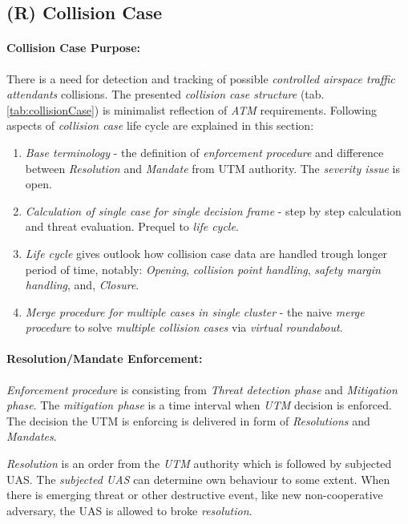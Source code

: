 \newpage
\subsection{(R) Collision Case}\label{sec:collisionCase}


\paragraph{Collision Case Purpose:} There is a need for detection and tracking of possible \emph{controlled airspace traffic attendants} collisions.  The presented \emph{collision case structure} (tab. \ref{tab:collisionCase}) is minimalist reflection of \emph{ATM} requirements. Following aspects of  \emph{collision case} life cycle are explained in this section:
\begin{enumerate}
    \item \emph{Base terminology} - the definition of \emph{enforcement procedure} and difference between \emph{Resolution} and \emph{Mandate} from UTM authority. The \emph{severity issue} is open.
    
    \item \emph{Calculation of single case for single decision frame} - step by step calculation and threat evaluation. Prequel to \emph{life cycle}.
    
    \item \emph{Life cycle} gives outlook how collision case data are handled trough longer period of time, notably: \emph{Opening}, \emph{collision point handling}, \emph{safety margin handling}, and, \emph{Closure}.
    
    \item \emph{Merge procedure for multiple cases in single cluster} - the naive \emph{merge procedure} to solve \emph{multiple collision cases} via \emph{virtual roundabout}.
\end{enumerate}


\paragraph{Resolution/Mandate Enforcement:}
\emph{Enforcement procedure} is consisting from \emph{Threat detection phase} and \emph{Mitigation phase}. The \emph{mitigation phase} is a time interval when \emph{UTM} decision is enforced. The decision the UTM is enforcing is delivered in form of \emph{Resolutions} and \emph{Mandates}.


\emph{Resolution} is an order from the \emph{UTM} authority which is followed by subjected UAS. The \emph{subjected UAS} can determine own behaviour to some extent. When there is emerging threat or other destructive event, like new non-cooperative adversary, the UAS is allowed to broke \emph{resolution}.  

